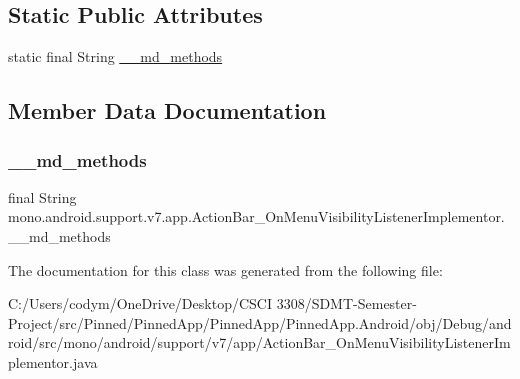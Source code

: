 \subsection*{Static Public Attributes}
\begin{DoxyCompactItemize}
\item 
static final String \hyperlink{classmono_1_1android_1_1support_1_1v7_1_1app_1_1_action_bar___on_menu_visibility_listener_implementor_a4514956c1b3554e5301274b9b8fb213f}{\+\_\+\+\_\+md\+\_\+methods}
\end{DoxyCompactItemize}


\subsection{Member Data Documentation}
\mbox{\label{classmono_1_1android_1_1support_1_1v7_1_1app_1_1_action_bar___on_menu_visibility_listener_implementor_a4514956c1b3554e5301274b9b8fb213f}} 
\subsubsection{\texorpdfstring{\+\_\+\+\_\+md\+\_\+methods}{\_\_md\_methods}}
{\footnotesize\ttfamily final String mono.\+android.\+support.\+v7.\+app.\+Action\+Bar\+\_\+\+On\+Menu\+Visibility\+Listener\+Implementor.\+\_\+\+\_\+md\+\_\+methods\hspace{0.3cm}{\ttfamily [static]}}



The documentation for this class was generated from the following file\+:\begin{DoxyCompactItemize}
\item 
C\+:/\+Users/codym/\+One\+Drive/\+Desktop/\+C\+S\+C\+I 3308/\+S\+D\+M\+T-\/\+Semester-\/\+Project/src/\+Pinned/\+Pinned\+App/\+Pinned\+App/\+Pinned\+App.\+Android/obj/\+Debug/android/src/mono/android/support/v7/app/Action\+Bar\+\_\+\+On\+Menu\+Visibility\+Listener\+Implementor.\+java\end{DoxyCompactItemize}
